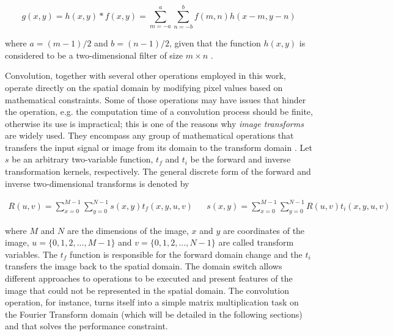 \begin{equation}
\label{eqn:2d_discrete_convolution}
g(x,y) = h(x,y) \ast f(x,y) = 
        \sum_{m=-a}^{a}
        \sum_{n=-b}^{b}
        f(m,n) h(x-m,y-n)
\end{equation}

\noindent where $a = (m-1)/2$ and $b = (n-1)/2$, given that the function $h(x,y)$ is considered to be a two-dimensional filter of size $m \times n$ \cite{gonzalez2018digital}.

Convolution, together with several other operations employed in this work, operate directly on the spatial domain by modifying pixel values based on mathematical constraints. Some of those operations may have issues that hinder the operation, e.g. the computation time of a convolution process should be finite, otherwise its use is impractical; this is one of the reasons why \emph{image transforms} are widely used. They encompass any group of mathematical operations that transfers the input signal or image from its domain to the transform domain \cite{gonzalez2008digital}. Let $s$ be an arbitrary two-variable function, $t_{f}$ and $t_{i}$ be the forward and inverse transformation kernels, respectively. The general discrete form of the forward and inverse two-dimensional transforms is denoted by 

\begin{align}
\label{eqn:generic_transform}
R(u,v) = 
\sum_{x=0}^{M-1}
\sum_{y=0}^{N-1}s(x,y)t_{f}(x,y,u,v)
&&
s(x,y) = 
\sum_{x=0}^{M-1}
\sum_{y=0}^{N-1}R(u,v)t_{i}(x,y,u,v)
\end{align}

\noindent where $M$ and $N$ are the dimensions of the image, $x$ and $y$ are coordinates of the image, $u = \{0,1,2,...,M-1\}$ and $v = \{0,1,2,...,N-1\}$ are called transform variables. The $t_{f}$ function is responsible for the forward domain change and the $t_{i}$ transfers the image back to the spatial domain. The domain switch allows different approaches to operations to be executed and present features of the image that could not be represented in the spatial domain. The convolution operation, for instance, turns itself into a simple matrix multiplication task on the Fourier Transform domain (which will be detailed in the following sections) and that solves the performance constraint.